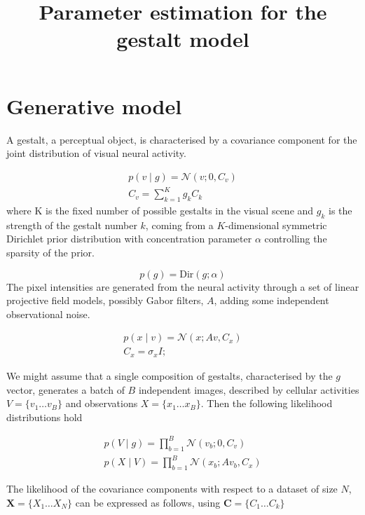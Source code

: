 \documentclass{paper}
\begin{document}
\title{Parameter estimation for the gestalt model}
\maketitle

\section{Generative model}

A gestalt, a perceptual object, is characterised by a covariance component for the joint distribution of visual neural activity. 

\begin{eqnarray}
p(v \mid g) = \mathcal{N}(v; 0,C_v) \\
C_v = \sum_{k=1}^K g_k C_k \label{eq:cv}
\end{eqnarray}
%
where K is the fixed number of possible gestalts in the visual scene and $g_k$ is the strength of the gestalt number $k$, coming from a $K$-dimensional symmetric Dirichlet prior distribution with concentration parameter $\alpha$ controlling the sparsity of the prior.

\begin{equation}
p(g) = \textrm{Dir}(g; \alpha)
\end{equation}
%
The pixel intensities are generated from the neural activity through a set of linear projective field models, possibly Gabor filters, $A$, adding some independent observational noise.

\begin{eqnarray}
p(x \mid v) = \mathcal{N}(x; Av,C_x) \\
C_x = \sigma_x I;
\end{eqnarray}

We might assume that a single composition of gestalts, characterised by the $g$ vector, generates a batch of $B$ independent images, described by cellular activities $V = \lbrace v_1 \dots v_B \rbrace$ and observations $X = \lbrace x_1 \dots x_B \rbrace$. Then the following likelihood distributions hold

\begin{eqnarray}
p(V \mid g) = \prod_{b=1}^B \mathcal{N}(v_b; 0,C_v) \\
p(X \mid V) = \prod_{b=1}^B \mathcal{N}(x_b; Av_b,C_x)
\end{eqnarray}

The likelihood of the covariance components with respect to a dataset of size $N$, $\mathbf{X} = \lbrace X_1 \dots X_N \rbrace$ can be expressed as follows, using $\mathbf{C} = \lbrace C_1 \dots C_k \rbrace$
\end{document}
